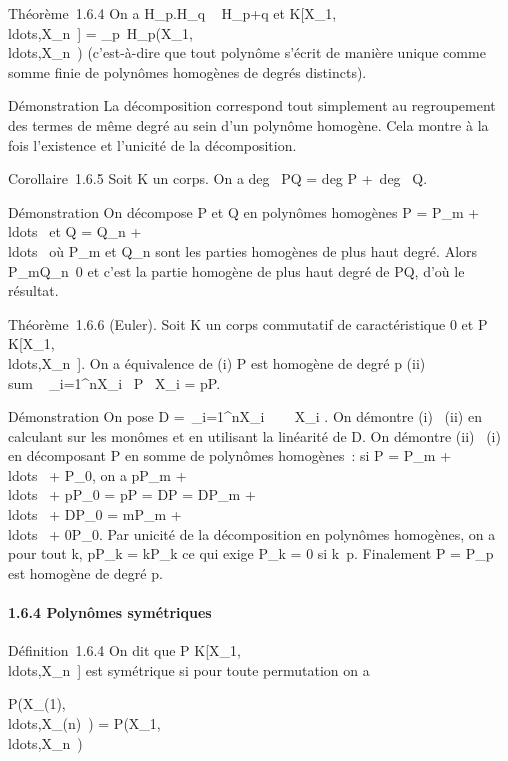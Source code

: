 Théorème~1.6.4 On a H_p.H_q \subset~ H_p+q et
K[X_1,\\ldots,X_n~]
=
\oplus_p\in{}~H_p(X_1,\\ldots,X_n~)
(c'est-à-dire que tout polynôme s'écrit de manière unique comme somme
finie de polynômes homogènes de degrés distincts).

Démonstration La décomposition correspond tout simplement au
regroupement des termes de même degré au sein d'un polynôme homogène.
Cela montre à la fois l'existence et l'unicité de la décomposition.

Corollaire~1.6.5 Soit K un corps. On a deg~ PQ
= deg P +\ deg~ Q.

Démonstration On décompose P et Q en polynômes homogènes P =
P_m +
\\ldots~ et Q =
Q_n +
\\ldots~ où
P_m et Q_n sont les parties homogènes de plus haut
degré. Alors P_mQ_n\neq~0 et
c'est la partie homogène de plus haut degré de PQ, d'où le résultat.

Théorème~1.6.6 (Euler). Soit K un corps commutatif de caractéristique 0
et P \in
K[X_1,\\ldots,X_n~].
On a équivalence de (i) P est homogène de degré p (ii)
\\sum ~
_i=1^nX_i \partial~P \over
\partial~X_i = pP.

Démonstration On pose D =\
\sum  _i=1^nX_i~ \partial~
\over \partial~X_i . On démontre (i) \rigtharrow~(ii) en
calculant sur les monômes et en utilisant la linéarité de D. On démontre
(ii) \rigtharrow~(i) en décomposant P en somme de polynômes homogènes~: si P =
P_m +
\\ldots~ +
P_0, on a pP_m +
\\ldots~ +
pP_0 = pP = DP = DP_m +
\\ldots~ +
DP_0 = mP_m +
\\ldots~ +
0P_0. Par unicité de la décomposition en polynômes homogènes,
on a pour tout k, pP_k = kP_k ce qui exige
P_k = 0 si k\neq~p. Finalement P =
P_p est homogène de degré p.

\paragraph{1.6.4 Polynômes symétriques}

Définition~1.6.4 On dit que P \in
K[X_1,\\ldots,X_n~]
est symétrique si pour toute permutation \sigma on a

P(X_\sigma(1),\\ldots,X_\sigma(n)~)
=
P(X_1,\\ldots,X_n~)

